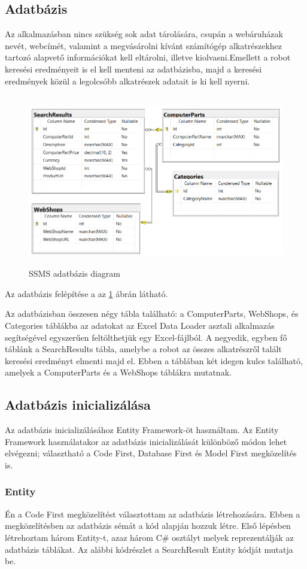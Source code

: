 \documentclass[
]{thesis-ekf}
\theoremstyle{definition}
\theoremstyle{remark}
\begin{document}
\subsection{Adatbázis}
Az alkalmazásban nincs szükség sok adat tárolására, csupán a webáruházak nevét, webcímét, valamint a megvásárolni kívánt számítógép alkatrészekhez tartozó alapvető információkat kell eltárolni, illetve kiolvasni.Emellett a robot keresési eredményeit is el kell menteni az adatbázisba, majd a keresési eredmények közül a legolcsóbb alkatrészek adatait is ki kell nyerni.
	\begin{figure}[!ht]
		\centering
		\includegraphics[width=15cm, height=7.5cm]{entity_diagram}
		\caption{SSMS adatbázis diagram}
		\label{picture-adatbazis}
	\end{figure}
Az adatbázis felépítése a az \ref{picture-adatbazis} ábrán látható. 

Az adatbázisban összesen négy tábla található: a ComputerParts, WebShops, és Categories táblákba az adatokat az Excel Data Loader asztali alkalmazás segítségével egyszerűen feltölthetjük egy Excel-fájlból.
A negyedik, egyben fő táblánk a SearchResults tábla, amelybe a robot az összes alkatrészről talált keresési eredményt elmenti majd el. Ebben a táblában két idegen kulcs található, amelyek a ComputerParts és a WebShops táblákra mutatnak.
\subsection{Adatbázis inicializálása}
Az adatbázis inicializálásához Entity Framework-öt használtam. Az Entity Framework használatakor az adatbázis inicializálását különböző módon lehet elvégezni; választható a Code First, Database First és Model First megközelítés is.
\subsubsection{Entity}
Én a Code First megközelítést választottam az adatbázis létrehozására. Ebben a megközelítésben az adatbázis sémát a kód alapján hozzuk létre. Első lépésben létrehoztam három Entity-t, azaz három C\# osztályt melyek reprezentálják az adatbázis táblákat. Az alábbi kódrészlet a SearchResult Entity kódját mutatja be.
\end{document}
